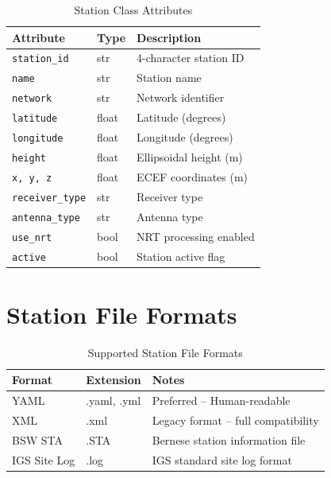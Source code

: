 \documentclass[11pt,a4paper,twoside]{report}
\newcommand{\code}[1]{\texttt{\small\color{primaryblue}#1}}
\begin{document}
\begin{table}[H]
\centering
\caption{Station Class Attributes}
\label{tab:station-attrs}
\begin{tabular}{@{}llp{5cm}@{}}
\toprule
\textbf{Attribute} & \textbf{Type} & \textbf{Description} \\
\midrule
\code{station\_id} & str & 4-character station ID \\
\code{name} & str & Station name \\
\code{network} & str & Network identifier \\
\code{latitude} & float & Latitude (degrees) \\
\code{longitude} & float & Longitude (degrees) \\
\code{height} & float & Ellipsoidal height (m) \\
\code{x, y, z} & float & ECEF coordinates (m) \\
\code{receiver\_type} & str & Receiver type \\
\code{antenna\_type} & str & Antenna type \\
\code{use\_nrt} & bool & NRT processing enabled \\
\code{active} & bool & Station active flag \\
\bottomrule
\end{tabular}
\end{table}

\section{Station File Formats}

\begin{table}[H]
\centering
\caption{Supported Station File Formats}
\label{tab:station-formats}
\begin{tabular}{@{}llp{6cm}@{}}
\toprule
\textbf{Format} & \textbf{Extension} & \textbf{Notes} \\
\midrule
YAML & .yaml, .yml & \textcolor{secondarygreen}{Preferred} -- Human-readable \\
XML & .xml & Legacy format -- full compatibility \\
BSW STA & .STA & Bernese station information file \\
IGS Site Log & .log & IGS standard site log format \\
\bottomrule
\end{tabular}
\end{table}
\end{document}
